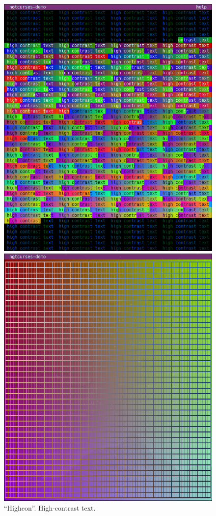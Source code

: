 \documentclass[letterpaper,10pt]{article}
\begin{document}
\begin{figure}
  \centering
  \begin{minipage}{0.45\textwidth}
    \includegraphics[width=1\linewidth]{media/demo-highcon.png}
    \caption{``Highcon''. High-contrast text.}
  \end{minipage}\hfill
  \begin{minipage}{0.45\textwidth}
    \includegraphics[width=1\linewidth]{media/demo-grid.png}

\end{minipage}
\end{figure}
\end{document}
